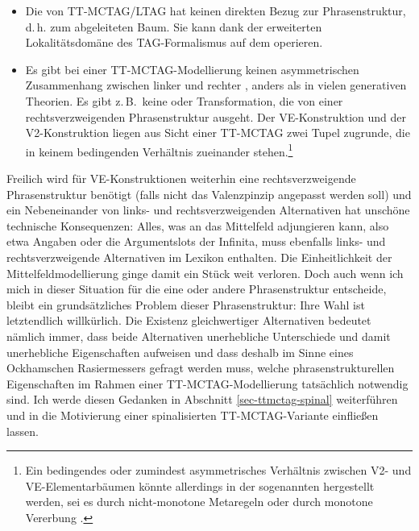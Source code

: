 \begin{itemize}
  \item Die  von TT-MCTAG/LTAG hat keinen direkten Bezug zur Phrasenstruktur, d.\,h. zum abgeleiteten Baum. Sie kann dank der erweiterten Lokalitätsdomäne des TAG-Formalismus auf dem  operieren.
  \item Es gibt bei einer TT-MCTAG-Modellierung keinen asymmetrischen Zusammenhang zwischen linker und rechter , anders als in vielen generativen Theorien. Es gibt z.\,B.\ keine  oder Transformation, die von einer rechtsverzweigenden Phrasenstruktur ausgeht. Der VE-Konstruktion und der V2-Konstruktion liegen aus Sicht einer TT-MCTAG zwei Tupel zugrunde, die in keinem bedingenden Verhältnis zueinander stehen.\footnote{Ein bedingendes oder zumindest asymmetrisches Verhältnis zwischen V2- und VE-Elementarbäumen könnte allerdings in der sogenannten  hergestellt werden, sei es durch nicht-monotone Metaregeln \citep{Becker:94,Becker:00,Prolo:02} oder durch monotone Vererbung \citep{Candito:96,Crabbe:etal:13}.}   
\end{itemize}

Freilich wird für VE-Konstruktionen weiterhin eine rechtsverzweigende Phrasenstruktur benötigt (falls nicht das Valenzpinzip angepasst werden soll) und ein Nebeneinander von links- und rechtsverzweigenden Alternativen hat unschöne technische Konsequenzen: Alles, was an das Mittelfeld adjungieren kann, also etwa Angaben oder die Argumentslots der Infinita, muss ebenfalls links- und rechtsverzweigende Alternativen im Lexikon enthalten. Die Einheitlichkeit der Mittelfeldmodellierung ginge damit ein Stück weit verloren. Doch auch wenn ich mich in dieser Situation für die eine oder andere Phrasenstruktur entscheide, bleibt ein grundsätzliches Problem dieser Phrasenstruktur: Ihre Wahl ist letztendlich willkürlich. Die Existenz gleichwertiger Alternativen bedeutet nämlich immer, dass beide Alternativen unerhebliche Unterschiede und damit unerhebliche Eigenschaften aufweisen und dass deshalb im Sinne eines Ockhamschen Rasiermessers gefragt werden muss, welche phrasenstrukturellen Eigenschaften im Rahmen einer TT-MCTAG-Modellierung tatsächlich notwendig sind. Ich werde diesen Gedanken in Abschnitt \ref{sec-ttmctag-spinal} weiterführen und in die Motivierung einer spinalisierten TT-MCTAG-Variante einflie\ss en lassen.    


